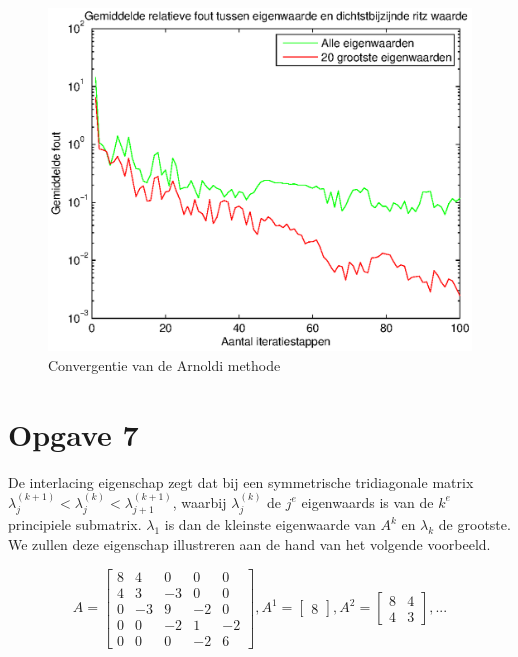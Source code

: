 \documentclass[]{article}
\newcommand{\opgave}[1]{\pagebreak\section*{Opgave #1}}
\begin{document}
\begin{figure}[h]
\noindent \includegraphics[width=0.92\linewidth]{Opgave6.eps}
\caption{Convergentie van de Arnoldi methode}
\label{opgave6}
\end{figure}


\opgave{7}

De interlacing eigenschap zegt dat bij een symmetrische tridiagonale matrix $\lambda ^{(k+1)}_{j} < \lambda ^{(k)}_{j} < \lambda ^{(k+1)}_{j+1}$, waarbij $\lambda ^{(k)}_{j}$ de $j^{e}$ eigenwaards is van de $k^{e}$ principiele submatrix. $\lambda _{1}$ is dan de kleinste eigenwaarde van $A^{k}$ en $\lambda _{k}$ de grootste. We zullen deze eigenschap illustreren aan de hand van het volgende voorbeeld.

\begin{equation}
A=\begin{bmatrix}
    	8 & 4 & 0 & 0 & 0	\\
    	4 & 3 & -3 & 0 & 0 \\
    	0 & -3 & 9 & -2 & 0 \\
    	0 & 0 & -2 & 1 & -2 \\
    	0 & 0 & 0 & -2 & 6 
    \end{bmatrix}
    ,
    A^{1}=\begin{bmatrix}
        	8
        \end{bmatrix}
        ,
    A^{2}=\begin{bmatrix}
           	8 & 4 \\
           	4 & 3
         \end{bmatrix}
         , ...
\end{equation}
\end{document}
